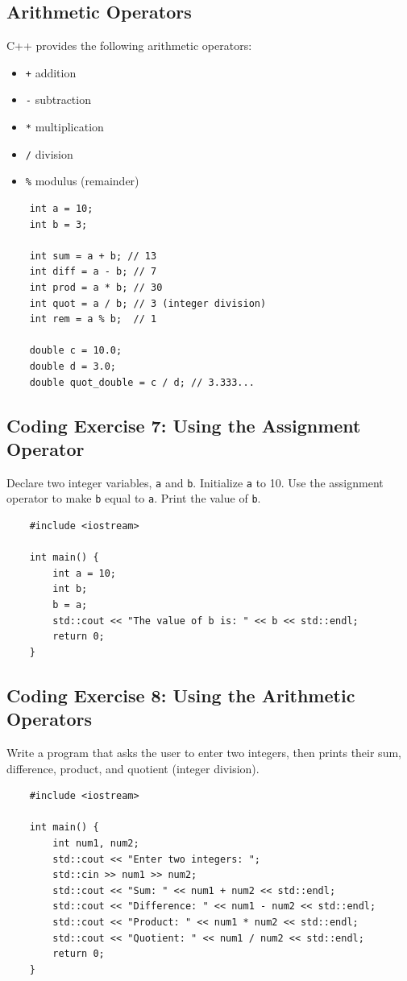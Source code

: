 \subsection{Arithmetic Operators}
C++ provides the following arithmetic operators:
\begin{itemize}
	\item \texttt{+} addition
	\item \texttt{-} subtraction
	\item \texttt{*} multiplication
	\item \texttt{/} division
	\item \texttt{\%} modulus (remainder)
\end{itemize}
\begin{lstlisting}
	int a = 10;
	int b = 3;

	int sum = a + b; // 13
	int diff = a - b; // 7
	int prod = a * b; // 30
	int quot = a / b; // 3 (integer division)
	int rem = a % b;  // 1

	double c = 10.0;
	double d = 3.0;
	double quot_double = c / d; // 3.333...
\end{lstlisting}

\subsection{Coding Exercise 7: Using the Assignment Operator}
Declare two integer variables, \texttt{a} and \texttt{b}. Initialize \texttt{a} to 10. Use the assignment operator to make \texttt{b} equal to \texttt{a}. Print the value of \texttt{b}.
\begin{lstlisting}
	#include <iostream>

	int main() {
		int a = 10;
		int b;
		b = a;
		std::cout << "The value of b is: " << b << std::endl;
		return 0;
	}
\end{lstlisting}

\subsection{Coding Exercise 8: Using the Arithmetic Operators}
Write a program that asks the user to enter two integers, then prints their sum, difference, product, and quotient (integer division).
\begin{lstlisting}
	#include <iostream>

	int main() {
		int num1, num2;
		std::cout << "Enter two integers: ";
		std::cin >> num1 >> num2;
		std::cout << "Sum: " << num1 + num2 << std::endl;
		std::cout << "Difference: " << num1 - num2 << std::endl;
		std::cout << "Product: " << num1 * num2 << std::endl;
		std::cout << "Quotient: " << num1 / num2 << std::endl;
		return 0;
	}
\end{lstlisting}

